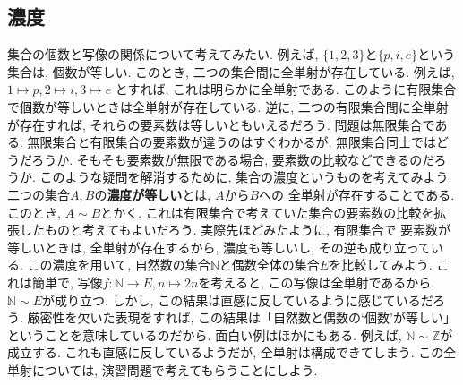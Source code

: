 \documentclass[a4j,dvipdfmx]{jsarticle}
\numberwithin{equation}{section}
\begin{document}
        \subsection{濃度}
                集合の個数と写像の関係について考えてみたい. 例えば, $\{1,2,3\}$と$\{p,i,e\}$という集合は, 個数が等しい. このとき, 二つの集合間に全単射が存在している. 例えば, $1\mapsto p,2\mapsto i,3\mapsto e$
                とすれば, これは明らかに全単射である. このように有限集合で個数が等しいときは全単射が存在している. 逆に, 二つの有限集合間に全単射が存在すれば, それらの要素数は等しいともいえるだろう.
                問題は無限集合である. 無限集合と有限集合の要素数が違うのはすぐわかるが, 無限集合同士ではどうだろうか. そもそも要素数が無限である場合, 要素数の比較などできるのだろうか.
                このような疑問を解消するために, 集合の濃度というものを考えてみよう. 二つの集合$A,B$の\textbf{濃度が等しい}とは, $A$から$B$への
                全単射が存在することである. このとき, $A\sim B$とかく. これは有限集合で考えていた集合の要素数の比較を拡張したものと考えてもよいだろう. 実際先ほどみたように, 有限集合で
                要素数が等しいときは, 全単射が存在するから, 濃度も等しいし, その逆も成り立っている. この濃度を用いて, 自然数の集合$\mathbb{N}$と偶数全体の集合$E$を比較してみよう.
                これは簡単で, 写像$f:\mathbb{N}\rightarrow E,n\mapsto 2n$を考えると, この写像は全単射であるから, $\mathbb{N}\sim E$が成り立つ. しかし, この結果は直感に反しているように感じているだろう.
                厳密性を欠いた表現をすれば, この結果は「自然数と偶数の`個数'が等しい」ということを意味しているのだから. 面白い例はほかにもある. 例えば, $\mathbb{N}\sim\mathbb{Z}$が成立する.
                これも直感に反しているようだが, 全単射は構成できてしまう. この全単射については, 演習問題で考えてもらうことにしよう.
\end{document}

